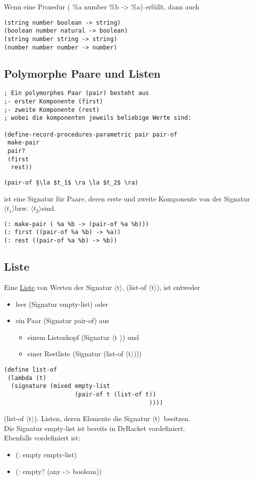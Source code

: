\documentclass[a4paper,12pt]{article}
\newcommand{\la}{$\langle$}
\newcommand{\ra}{$\rangle$}
\begin{document}
Wenn eine Prozedur ( \%a number  \%b -> \%a) erfüllt, dann auch 
\begin{lstlisting}[style=customc]
(string number boolean -> string)
(boolean number natural -> boolean)
(string number string -> string)
(number number number -> number)
\end{lstlisting}
\newpage
\subsection{Polymorphe Paare und Listen}
\begin{lstlisting}[style=customc]
; Ein polymorphes Paar (pair) besteht aus
;- erster Komponente (first)
;- zweite Komponente (rest)
; wobei die komponenten jeweils beliebige Werte sind:

(define-record-procedures-parametric pair pair-of
 make-pair
 pair?
 (first
  rest))
\end{lstlisting}


\begin{lstlisting}
(pair-of §\la $t_1$ \ra \la $t_2$ \ra)
\end{lstlisting}
ist eine Signatur für Paare, deren erste und zweite Komponente von der Signatur \la $t_1$\ra bzw. \la $t_2$\ra sind.
\begin{lstlisting}[style=customc]
(: make-pair ( %a %b -> (pair-of %a %b)))
(: first ((pair-of %a %b) -> %a))
(: rest ((pair-of %a %b) -> %b))
\end{lstlisting}
\subsection{Liste}
Eine \uline{Liste} von Werten der Signatur \la t\ra, (list-of \la t\ra), ist entweder
\begin{itemize}
\item leer (Signatur empty-list) oder
\item ein Paar (Signatur pair-of) aus 
\begin{itemize}
\item einem Listenkopf (Signatur \la t \ra) und
\item einer Restliste (Signatur (list-of \la t\ra)))
\end{itemize}
\end{itemize}
\begin{lstlisting}[style=customc]
(define list-of
 (lambda (t)
  (signature (mixed empty-list
                    (pair-of t (list-of t))
                                         ))))
\end{lstlisting}
(list-of \la t\ra). Listen, deren Elemente die Signatur \la t\ra\ besitzen.\\
Die Signatur empty-list ist bereits in DrRacket vordefiniert. \\Ebenfalls vordefiniert ist:
\begin{itemize}[-]
\item (: empty empty-list)
\item (: empty? (any -> boolean))
\end{itemize}
\end{document}

